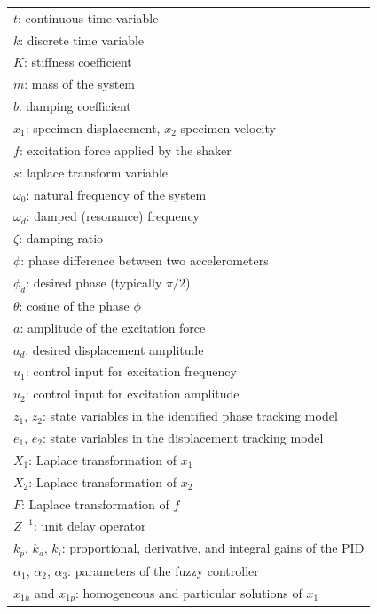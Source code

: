 \documentclass[preprint,12pt]{elsarticle}
\begin{document}
\begin{table}
    \centering
    \begin{tabular}{|l|}
        \hline
        $t$: continuous time variable \\
	 $k$: discrete time variable \\ 
        $K$:  stiffness coefficient \\
	 $m$:  mass of the system \\
        $b$:  damping coefficient \\
        $x_1$:  specimen displacement,  $x_2$  specimen velocity \\
        $f$:  excitation force applied by the shaker \\
        $s$:  laplace transform variable \\
        $\omega_0$:  natural frequency of the system \\
        $\omega_d$:  damped (resonance) frequency \\
        $\zeta$:  damping ratio \\
        $\phi$:  phase difference between two accelerometers  \\
        $\phi_d$:  desired phase (typically $\pi/2$) \\
        $\theta$:  cosine of the phase $\phi$ \\
        $a$:  amplitude of the excitation force \\
        $a_d$:  desired displacement amplitude \\
        $u_1$: control input for excitation frequency \\
        $u_2$:  control input for excitation amplitude \\
        $z_1$, $z_2$:  state variables in the identified phase tracking model \\
        $e_1$, $e_2$:  state variables in the displacement tracking model \\
$X_1$: Laplace transformation of $x_1$ \\
$X_2$: Laplace transformation of $x_2$ \\
$F$: Laplace transformation of $f$ \\
$Z^{-1}$: unit delay operator \\
$k_p$, $k_d$, $k_i$: proportional, derivative, and integral gains of the PID\\
$\alpha_1$, $\alpha_2$, $\alpha_3$: parameters of the fuzzy controller \\
$x_{1h}$ and $x_{1p}$: homogeneous and particular solutions of $x_1$ \\

\end{tabular}
\end{table}
\end{document}
